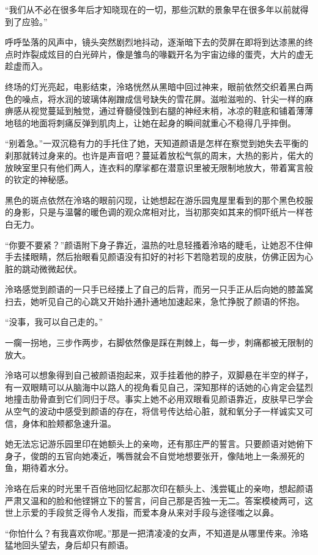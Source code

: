 \documentclass[UTF8, scheme = chinese, openany]{ctexbook}
\begin{document}
“我们从不必在很多年后才知晓现在的一切，那些沉默的景象早在很多年以前就得到了应验。”

呼呼坠落的风声中，镜头突然剧烈地抖动，逐渐暗下去的荧屏在即将到达漆黑的终点时炸裂成炫目的白光碎片，像是雏鸟的喙戳开名为宇宙边缘的蛋壳，大片的虚无趁虚而入。

终场的灯光亮起，电影结束，泠珞恍然从黑暗中回过神来，眼前依然交织着黑白两色的噪点，将水润的玻璃体剐蹭成信号缺失的雪花屏。滋啦滋啦的、针尖一样的麻痹感从视觉蔓延到触觉，通过脊髓侵蚀到右腿的神经末梢，冰凉的鞋底和铺着薄薄地毯的地面将刺痛反弹到肌肉上，让她在起身的瞬间就重心不稳得几乎摔倒。

“别着急。”一双沉稳有力的手托住了她，天知道颜语是怎样在察觉到她失去平衡的刹那就转过身来的。也许是声音吧？蔓延着放松气氛的周末，大热的影片，偌大的放映室里只有他们两人，连衣料的摩挲都在潜意识里被无限制地放大，带着寓言般的钦定的神秘感。

黑色的斑点依然在泠珞的眼前闪现，让她想起在游乐园鬼屋里看到的那个黑色校服的身影，只是与温馨的暖色调的观众席相对比，当初那突如其来的恫吓纸片一样苍白无力。

“你要不要紧？”颜语附下身子靠近，温热的吐息轻搔着泠珞的睫毛，让她忍不住伸手去揉眼睛，然后抬眼看见颜语没有扣好的衬衫下若隐若现的皮肤，仿佛正因为心脏的跳动微微起伏。

泠珞感觉到颜语的一只手已经搂上了自己的后背，而另一只手正从后向她的膝盖窝扫去，她听见自己的心跳又开始扑通扑通地加速起来，急忙挣脱了颜语的怀抱。

“没事，我可以自己走的。”

一瘸一拐地，三步作两步，右脚依然像是踩在荆棘上，每一步，刺痛都被无限制的放大。

泠珞可以想象得到自己被颜语抱起来，双手挂着他的脖子，双脚悬在半空的样子，有一双眼睛可以从脑海中以路人的视角看见自己，深知那样的话她的心肯定会猛烈地撞击肋骨直到它们同归于尽。事实上她不必用双眼看见颜语靠近，皮肤早已学会从空气的波动中感受到颜语的存在，将信号传达给心脏，就和氧分子一样诚实又可信，身体和脸颊都急速升温。

她无法忘记游乐园里印在她额头上的亲吻，还有那庄严的誓言。只要颜语对她俯下身子，俊朗的五官向她凑近，嘴唇就会不自觉地想要张开，像陆地上一条濒死的鱼，期待着水分。

泠珞在后来的时光里千百倍地回忆起那次印在额头上、浅尝辄止的亲吻，想起颜语严肃又温和的脸和他铿锵立下的誓言，问自己那是否独一无二。答案模棱两可，这世上示爱的手段贫乏得令人发指，而爱本身从来对手段与途径嗤之以鼻。

“你怕什么？有我喜欢你呢。”那是一把清凌凌的女声，不知道是从哪里传来。泠珞猛地回头望去，身后却只有颜语。
\end{document}
